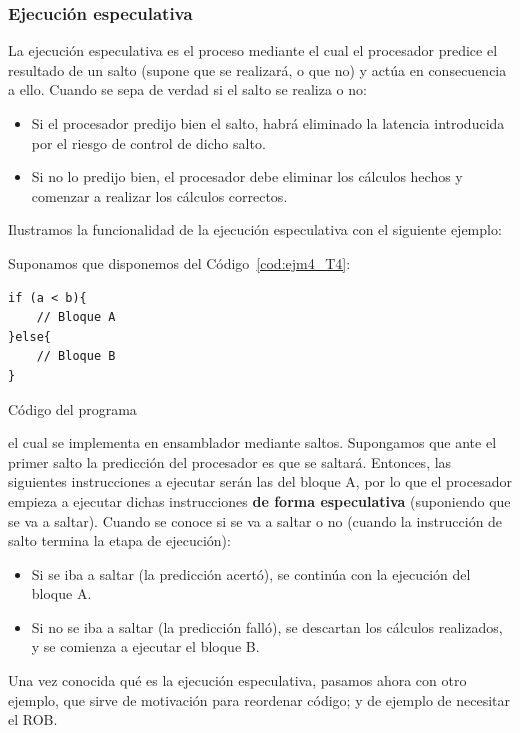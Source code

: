 \subsubsection{Ejecución especulativa}
La ejecución especulativa es el proceso mediante el cual el procesador predice el resultado de un salto (supone que se realizará, o que no) y actúa en consecuencia a ello. Cuando se sepa de verdad si el salto se realiza o no:
\begin{itemize}
    \item Si el procesador predijo bien el salto, habrá eliminado la latencia introducida por el riesgo de control de dicho salto.
    \item Si no lo predijo bien, el procesador debe eliminar los cálculos hechos y comenzar a realizar los cálculos correctos.
\end{itemize}
Ilustramos la funcionalidad de la ejecución especulativa con el siguiente ejemplo:
\begin{ejemplo}
    Suponamos que disponemos del Código~\ref{cod:ejm4_T4}:
    \begin{listing}[H]
    \begin{verbatim}
if (a < b){
    // Bloque A
}else{
    // Bloque B
}
    \end{verbatim}
    \caption{Código del programa}
    \label{cod:ejm4_T4}
    \end{listing}
    el cual se implementa en ensamblador mediante saltos. Supongamos que ante el primer salto la predicción del procesador es que se saltará. Entonces, las siguientes instrucciones a ejecutar serán las del bloque A, por lo que el procesador empieza a ejecutar dichas instrucciones \textbf{de forma especulativa} (suponiendo que se va a saltar). Cuando se conoce si se va a saltar o no (cuando la instrucción de salto termina la etapa de ejecución):
    \begin{itemize}
        \item Si se iba a saltar (la predicción acertó), se continúa con la ejecución del bloque A.
        \item Si no se iba a saltar (la predicción falló), se descartan los cálculos realizados, y se comienza a ejecutar el bloque B.
    \end{itemize}
\end{ejemplo}

Una vez conocida qué es la ejecución especulativa, pasamos ahora con otro ejemplo, que sirve de motivación para reordenar código; y de ejemplo de necesitar el ROB.

